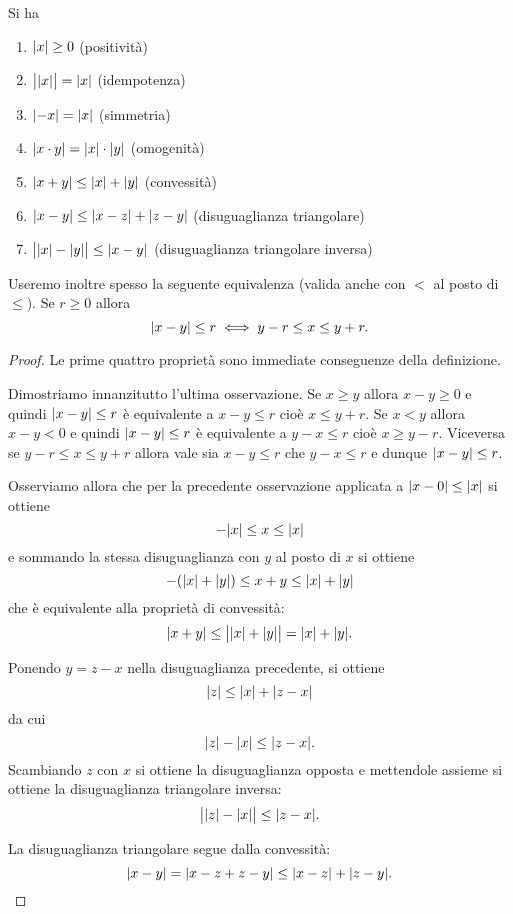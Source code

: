 \begin{proposition}
\mymark{**}
Si ha
\begin{enumerate}
\item ${\left|x\right|}\ge 0$ (positività)
\item $\big\lvert{\left|x\right|}\big\rvert = {\left|x\right|}$ (idempotenza)
\item ${\left|-x\right|} = {\left|x\right|}$ (simmetria)
\item ${\left|x\cdot y\right|} = {\left|x\right|}\cdot {\left|y\right|}$ (omogenità)
\item ${\left|x+y\right|} \le {\left|x\right|} + {\left|y\right|}$ (convessità)
\item ${\left|x-y\right|} \le {\left|x-z\right|} + {\left|z-y\right|}$ (disuguaglianza triangolare)
\item $\big\lvert{\left|x\right|}-{\left|y\right|}\big\rvert \le {\left|x-y\right|}$ (disuguaglianza triangolare inversa)
\end{enumerate}
Useremo inoltre spesso la seguente equivalenza (valida
anche con $<$ al posto di $\le$). Se $r\ge 0$ allora
\[
 {\left|x-y\right|} \le r
 \iff
 y - r \le x \le y + r.
\]
\end{proposition}
%
\begin{proof}
\mymark{*}
Le prime quattro proprietà sono immediate conseguenze della definizione.

Dimostriamo innanzitutto l'ultima osservazione.
Se $x\ge y$ allora $x-y\ge 0$ e quindi ${\left|x-y\right|} \le r$ è
equivalente a $x-y\le r$ cioè $x\le y+r$.
Se $x<y$ allora $x-y<0$ e quindi ${\left|x-y\right|} \le r$ è
equivalente a $y-x \le r$ cioè $x\ge y-r$.
Viceversa se $y-r \le x \le y+r$ allora vale sia $x-y \le r$ che $y-x \le r$ e dunque ${\left|x-y\right|}\le r$.

Osserviamo allora che per la precedente osservazione applicata
a ${\left|x-0\right|} \le {\left|x\right|}$ si ottiene
\[
  -{\left|x\right|} \le x \le {\left|x\right|}
\]
e sommando la stessa disuguaglianza con $y$ al posto di $x$ si
ottiene
\[
  -({\left|x\right|} + {\left|y\right|}) \le x + y \le {\left|x\right|} + {\left|y\right|}
\]
che è equivalente alla proprietà di convessità:
\[
  {\left|x+y\right|} \le \big\lvert{\left|x\right|} + {\left|y\right|}\big\rvert = {\left|x\right|} + {\left|y\right|}.
\]

Ponendo $y=z-x$ nella disuguaglianza precedente, si ottiene
\[
  {\left|z\right|} \le {\left|x\right|} + {\left|z-x\right|}
\]
da cui
\[
  {\left|z\right|} - {\left|x\right|} \le {\left|z-x\right|}.
\]
Scambiando $z$ con $x$ si ottiene la disuguaglianza opposta
e mettendole assieme si ottiene
la disuguaglianza triangolare inversa:
\[
\big\lvert {\left|z\right|}-{\left|x\right|} \big\rvert  \le {\left|z-x\right|}.
\]

La disuguaglianza triangolare segue dalla convessità:
\[
 {\left|x-y\right|} = {\left|x-z + z-y\right|} \le {\left|x-z\right|} + {\left|z-y\right|}.
\]
\end{proof}

